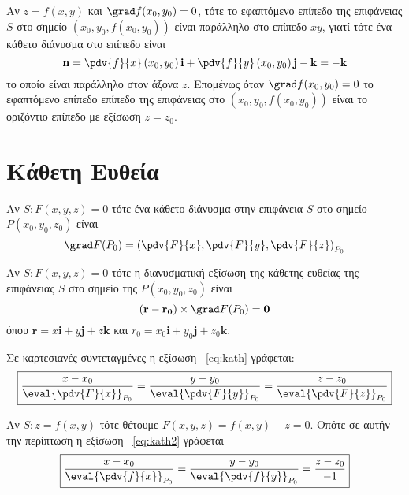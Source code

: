 \begin{rem}
  Αν $ z=f(x,y) $ και $ \grad f(x_{0}, y_{0}) = 0 $, τότε το εφαπτόμενο επίπεδο 
  της επιφάνειας $S$ στο σημείο $ (x_{0}, y_{0}, f(x_{0}, y_{0})) $ είναι 
  παράλληλο στο επίπεδο $ xy $, γιατί τότε ένα κάθετο διάνυσμα στο επίπεδο είναι 
  \[
    \mathbf{n} = \pdv{f}{x} \left(x_{0}, y_{0}\right)  \mathbf{i} + 
    \pdv{f}{y} \left(x_{0}, y_{0}\right) \mathbf{j} - \mathbf{k} = - \mathbf{k}
  \] 
  το οποίο είναι παράλληλο στον άξονα $z$. Επομένως όταν 
  $ \grad f(x_{0}, y_{0}) = 0 $ το εφαπτόμενο επίπεδο επίπεδο της επιφάνειας στο 
  $ (x_{0}, y_{0}, f(x_{0}, y_{0})) $ είναι το οριζόντιο επίπεδο με εξίσωση 
  $ z = z_{0} $.
\end{rem}


\section{Κάθετη Ευθεία}

\begin{myitemize}
  \item Αν $S: F(x,y,z)=0$ τότε ένα κάθετο διάνυσμα στην επιφάνεια $S$ 
    στο σημείο $ P(x_{0}, y_{0}, z_{0}) $ είναι
    \[
      \grad F{(P_{0})} = \left(\pdv{F}{x}, \pdv{F}{y}, \pdv{F}{z}\right)_{P_{0}}
    \]
  \item Αν $S: F(x,y,z)=0$ τότε η διανυσματική εξίσωση της κάθετης ευθείας της 
    επιφάνειας $S$ στο σημείο της $ P(x_{0}, y_{0}, z_{0}) $ είναι
    \begin{equation}\label{eq:kath}
      (\mathbf{r} - \mathbf{r_{0}}) \times \grad F(P_{0}) = \mathbf{0}
    \end{equation} 
    όπου $ \mathbf{r}=x \mathbf{i}+y \mathbf{j}+z \mathbf{k} $ και 
    $ r_{0}=x_{0} \mathbf{i}+ y _{0} \mathbf{j}+ z_{0} \mathbf{k} $.

    Σε καρτεσιανές συντεταγμένες η εξίσωση ~\eqref{eq:kath} γράφεται:
    \begin{equation}\label{eq:kath2}
      \boxed{ 
        \frac{x- x_{0}}{\eval{\pdv{F}{x}} _{P_{0}}} = 
        \frac{y- y_{0}}{\eval{\pdv{F}{y}} _{P_{0}}} = 
        \frac{z- z_{0}}{\eval{\pdv{F}{z}} _{P_{0}}}  
      }
    \end{equation}

  \item Αν $ S: z=f(x,y) $ τότε θέτουμε $ F(x,y,z) =  f(x,y) - z = 0 $. Οπότε σε
    αυτήν την περίπτωση η εξίσωση ~\eqref{eq:kath2} γράφεται
    \[
      \boxed{
        \frac{x- x_{0}}{\eval{\pdv{f}{x}} _{P_{0}}} = 
        \frac{y- y_{0}}{\eval{\pdv{f}{y}} _{P_{0}}} = 
        \frac{z- z_{0}}{-1} 
      }
    \] 
\end{myitemize}


